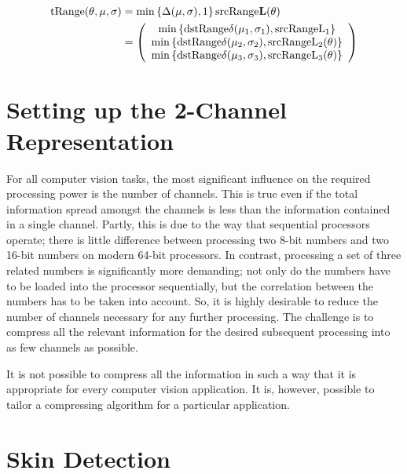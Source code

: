 \begin{equation}\label{eq:CombinedRotation}
\begin{aligned}
 \text{tRange}(\theta,\mu,\sigma) &= \min\left\{\Delta(\mu,\sigma), 1 \right\} \text{srcRange} \mathbf{L}(\theta) \\
 &= 
\left(
\begin{array}{c}
\min\left\{\text{dstRange} \delta(\mu_1,\sigma_1), \text{srcRange} \text{L}_1 \right\} \\
\min\left\{\text{dstRange} \delta(\mu_2,\sigma_2), \text{srcRange} \text{L}_2(\theta) \right\}  \\
\min\left\{\text{dstRange} \delta(\mu_3,\sigma_3), \text{srcRange} \text{L}_3(\theta) \right\}  \\
\end{array}
\right)
\end{aligned}
\end{equation}
\section{Setting up the 2-Channel Representation}\label{sec:SettingUp2-ChannelRepresentation}

For all computer vision tasks, the most significant influence on the required processing power is the number of channels. This is true even if the total information spread amongst the channels is less than the information contained in a single channel. Partly, this is due to the way that sequential processors operate; there is little difference between processing two 8-bit numbers and two 16-bit numbers on modern 64-bit processors. In contrast, processing a set of three related numbers is significantly more demanding; not only do the numbers have to be loaded into the processor sequentially, but the correlation between the numbers has to be taken into account. So, it is highly desirable to reduce the number of channels necessary for any further processing. The challenge is to compress all the relevant information for the desired subsequent processing into as few channels as possible.

It is not possible to compress all the information in such a way that it is appropriate for every computer vision application. It is, however, possible to tailor a compressing algorithm for a particular application.


\section{Skin Detection}\label{sec:SkinDetection}

